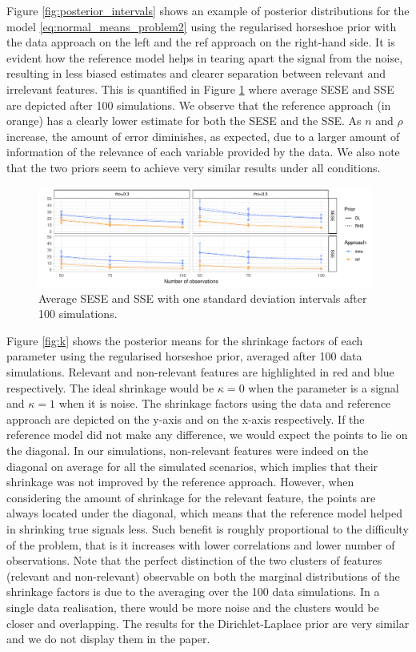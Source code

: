 \documentclass[american,]{article}
\theoremstyle{definition}
\begin{document}
Figure \ref{fig:posterior_intervals} shows an example of posterior distributions for the model \eqref{eq:normal_means_problem2} using the regularised horseshoe prior with the data approach on the left and the ref approach on the right-hand side. It is evident how the reference model helps in tearing apart the signal from the noise, resulting in less biased estimates and clearer separation between relevant and irrelevant features. This is quantified in Figure \ref{fig:SESE_SSE} where average SESE and SSE are depicted after 100 simulations. We observe that the reference approach (in orange) has a clearly lower estimate for both the SESE and the SSE. As $n$ and $\rho$ increase, the amount of error diminishes, as expected, due to a larger amount of information of the relevance of each variable provided by the data. We also note that the two priors seem to achieve very similar results under all conditions.

\begin{figure}[tp]
  \centering
  \includegraphics[width=0.98\textwidth]{graphics/SESE_SSE.pdf}
  \caption{Average SESE and SSE with one standard deviation intervals after 100 simulations.\\}
  \label{fig:SESE_SSE}
\end{figure}

Figure \ref{fig:k} shows the posterior means for the shrinkage factors of each parameter using the regularised horseshoe prior, averaged after 100 data simulations. Relevant and non-relevant features are highlighted in red and blue respectively. The ideal shrinkage would be $\kappa=0$ when the parameter is a signal and $\kappa=1$ when it is noise. The shrinkage factors using the data and reference approach are depicted on the y-axis and on the x-axis respectively. If the reference model did not make any difference, we would expect the points to lie on the diagonal. In our simulations, non-relevant features were indeed on the diagonal on average for all the simulated scenarios, which implies that their shrinkage was not improved by the reference approach. However, when considering the amount of shrinkage for the relevant feature, the points are always located under the diagonal, which means that the reference model helped in shrinking true signals less. Such benefit is roughly proportional to the difficulty of the problem, that is it increases with lower correlations and lower number of observations. Note that the perfect distinction of the two clusters of features (relevant and non-relevant) observable on both the marginal distributions of the shrinkage factors is due to the averaging over the 100 data simulations. In a single data realisation, there would be more noise and the clusters would be closer and overlapping. The results for the Dirichlet-Laplace prior are very similar and we do not display them in the paper.
\end{document}
